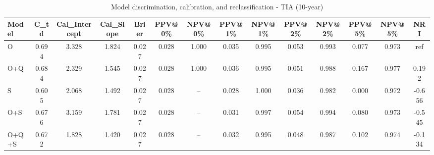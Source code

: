 \begin{table}[htbp]
\centering
\small
\caption{Model discrimination, calibration, and reclassification - TIA (10-year)}
\label{tab:perf_tia_10y}
\begin{tabular}{lccccccccccccc}
\toprule
Model & C\_td & Cal\_Intercept & Cal\_Slope & Brier & PPV@0\% & NPV@0\% & PPV@1\% & NPV@1\% & PPV@2\% & NPV@2\% & PPV@5\% & NPV@5\% & NRI \\
\midrule
O & 0.694 & 3.328 & 1.824 & 0.027 & 0.028 & 1.000 & 0.035 & 0.995 & 0.053 & 0.993 & 0.077 & 0.973 & ref \\
O+Q & 0.684 & 2.329 & 1.545 & 0.027 & 0.028 & 1.000 & 0.036 & 0.995 & 0.051 & 0.988 & 0.167 & 0.977 & 0.192 \\
S & 0.605 & 2.068 & 1.492 & 0.027 & 0.028 & -- & 0.028 & 1.000 & 0.036 & 0.982 & 0.000 & 0.972 & -0.656 \\
O+S & 0.676 & 3.159 & 1.781 & 0.027 & 0.028 & -- & 0.031 & 0.997 & 0.054 & 0.994 & 0.080 & 0.973 & -0.545 \\
O+Q+S & 0.672 & 1.828 & 1.420 & 0.027 & 0.028 & -- & 0.032 & 0.995 & 0.048 & 0.987 & 0.102 & 0.974 & -0.134 \\
\bottomrule
\end{tabular}
\end{table}